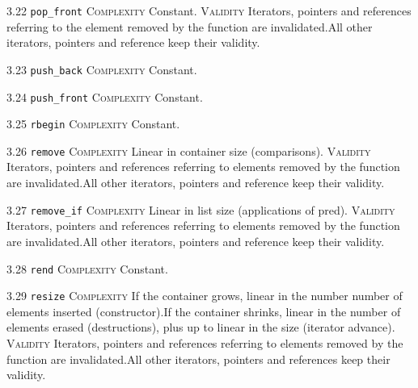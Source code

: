 \noindent\textcolor{cgreen}{3.22 \texttt{pop\_front}} \textsc{Complexity} Constant. \textsc{Validity} Iterators, pointers and references referring to the element removed by the function are invalidated.All other iterators, pointers and reference keep their validity.\vspace{0.5em}

\noindent\textcolor{cgreen}{3.23 \texttt{push\_back}} \textsc{Complexity} Constant. \vspace{0.5em}

\noindent\textcolor{cgreen}{3.24 \texttt{push\_front}} \textsc{Complexity} Constant. \vspace{0.5em}

\noindent\textcolor{cgreen}{3.25 \texttt{rbegin}} \textsc{Complexity} Constant. \vspace{0.5em}

\noindent\textcolor{corange}{3.26 \texttt{remove}} \textsc{Complexity} Linear in container size (comparisons). \textsc{Validity} Iterators, pointers and references referring to elements removed by the function are invalidated.All other iterators, pointers and reference keep their validity.\vspace{0.5em}

\noindent\textcolor{corange}{3.27 \texttt{remove\_if}} \textsc{Complexity} Linear in list size (applications of pred). \textsc{Validity} Iterators, pointers and references referring to elements removed by the function are invalidated.All other iterators, pointers and reference keep their validity.\vspace{0.5em}

\noindent\textcolor{cgreen}{3.28 \texttt{rend}} \textsc{Complexity} Constant. \vspace{0.5em}

\noindent\textcolor{corange}{3.29 \texttt{resize}} \textsc{Complexity} If the container grows, linear in the number number of elements inserted (constructor).If the container shrinks, linear in the number of elements erased (destructions), plus up to linear in the size (iterator advance). \textsc{Validity} Iterators, pointers and references referring to elements removed by the function are invalidated.All other iterators, pointers and references keep their validity.\vspace{0.5em}

